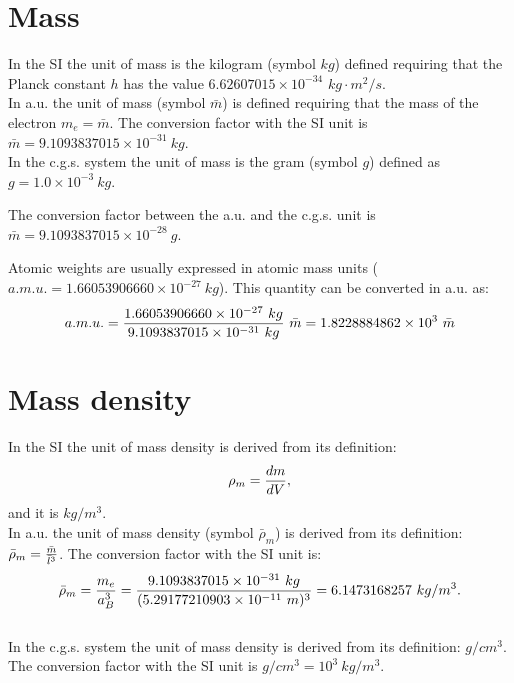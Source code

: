 \documentclass[12pt,a4paper]{article}
\def\hplanck{6.62607015\times 10^{-34}}
\def\amu{1.66053906660\times 10^{-27}}
\def\me{9.1093837015\times 10^{-31}}
\def\abohr{5.29177210903\times 10^{-11}}
\def\barm{9.1093837015\times 10^{-31}}
\def\barrhom{6.1473168257}
\def\gtokg{1.0\times 10^{-3}}
\def\barmcgs{9.1093837015\times 10^{-28}}
\def\amuau{1.8228884862\times 10^{3}}
\begin{document}
\newpage

\section{\color{coral}Mass}
In the SI the unit of mass is the kilogram (symbol $kg$) defined
requiring that the Planck constant $h$ has the value
$\hplanck$ $kg \cdot m^2 / s$. 
\\

{\color{web-blue} In a.u. the unit of mass (symbol $\bar m$) is defined
requiring that the mass of the electron $m_e= \bar m$. The conversion
factor with the SI unit is $\bar m = \me\ kg$.
}
\\

{\color{orange} In the c.g.s. system the unit of mass is the gram 
(symbol $g$) defined as $g =\gtokg\ kg$. 
\\
}

{\color{green} The conversion factor between the a.u. and the c.g.s. unit is
$\bar m=\barmcgs\ g$.
\\
}

{\color{red} Atomic weights are usually expressed in atomic mass units
($a.m.u.=\amu\ kg$). This quantity can be converted in a.u. as:
\begin{equation}
a.m.u. = {\amu\ kg \over \barm\ kg }\ \bar m=\amuau\ \bar m
\end{equation}
}

\newpage
\section{\color{coral}Mass density}
In the SI the unit of mass density is derived from its definition:
\begin{equation}
\rho_m= {d m \over d V},
\end{equation}
and it is $kg/m^3$.
\\

{\color{web-blue} In a.u. the unit of mass density 
(symbol $\bar \rho_m$) is derived from
its definition: $\bar \rho_m= {\bar m \over \bar l^3}$.
The conversion factor with the SI unit is:
\begin{equation}
\bar \rho_m = {m_e \over a_B^3}= {\me\ kg \over (\abohr\ m)^3}=
\barrhom\ kg/m^3.
\end{equation}
}
\\

{\color{orange} In the c.g.s. system the unit of mass density is derived from
its definition: ${g/cm^3}$. The conversion factor with
the SI unit is ${g/cm^3}=10^3\ kg/m^3$.
}
\\
\end{document}
